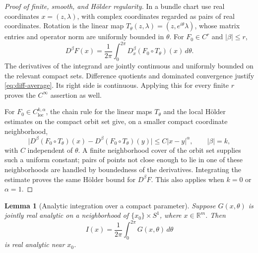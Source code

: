 \documentclass[11pt]{amsart}
\newtheorem{lemma}[theorem]{Lemma}
\theoremstyle{definition}
\theoremstyle{remark}
\numberwithin{equation}{section}
\newcommand{\R}{\mathbb R}
\newcommand{\loc}{\mathrm{loc}}
\begin{document}
\begin{proof}[Proof of finite, smooth, and H\"older regularity]
In a bundle chart use real coordinates $x=(z,\lambda)$, with complex
coordinates regarded as pairs of real coordinates. Rotation is the
linear map $T_\theta(z,\lambda)=(z,e^{i\theta}\lambda)$, whose matrix
entries and operator norm are uniformly bounded in $\theta$.
For $F_0\in C^r$ and $|\beta|\le r$,
\begin{equation}\label{eq:diff-average}
D^\beta F(x)=\frac1{2\pi}\int_0^{2\pi}
D_x^\beta(F_0\circ T_\theta)(x)\,d\theta.
\end{equation}
The derivatives of the integrand are jointly continuous and uniformly
bounded on the relevant compact sets. Difference quotients and
dominated convergence justify \eqref{eq:diff-average}. Its right side
is continuous. Applying this for every finite $r$ proves the
$C^\infty$ assertion as well.

For $F_0\in C^{k,\alpha}_{\loc}$, the chain rule for the linear maps
$T_\theta$ and the local H\"older estimates on the compact orbit set
give, on a smaller compact coordinate neighborhood,
\[
\bigl|D^\beta(F_0\circ T_\theta)(x)
-D^\beta(F_0\circ T_\theta)(y)\bigr|
\le C|x-y|^\alpha,\qquad |\beta|=k,
\]
with $C$ independent of $\theta$. A finite neighborhood cover of the
orbit set supplies such a uniform constant; pairs of points not close
enough to lie in one of these neighborhoods are handled by boundedness
of the derivatives. Integrating the estimate proves the same H\"older
bound for $D^\beta F$. This also applies when $k=0$ or $\alpha=1$.
\end{proof}

\begin{lemma}[Analytic integration over a compact parameter]\label{lem:analytic-integral}
Suppose $G(x,\theta)$ is jointly real analytic on a neighborhood of
$\{x_0\}\times S^1$, where $x\in\R^m$. Then
\[
I(x)=\frac1{2\pi}\int_0^{2\pi}G(x,\theta)\,d\theta
\]
is real analytic near $x_0$.
\end{lemma}
\end{document}
